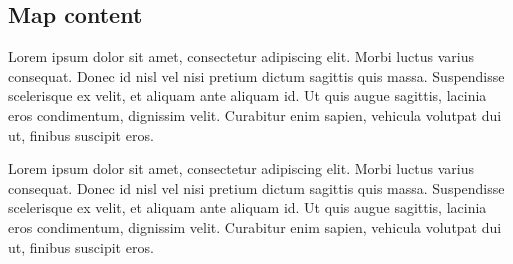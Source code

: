 
\subsection{Map content}

Lorem ipsum dolor sit amet, consectetur adipiscing elit. Morbi luctus varius consequat. Donec id nisl vel nisi pretium dictum sagittis quis massa. Suspendisse scelerisque ex velit, et aliquam ante aliquam id. Ut quis augue sagittis, lacinia eros condimentum, dignissim velit. Curabitur enim sapien, vehicula volutpat dui ut, finibus suscipit eros. 

Lorem ipsum dolor sit amet, consectetur adipiscing elit. Morbi luctus varius consequat. Donec id nisl vel nisi pretium dictum sagittis quis massa. Suspendisse scelerisque ex velit, et aliquam ante aliquam id. Ut quis augue sagittis, lacinia eros condimentum, dignissim velit. Curabitur enim sapien, vehicula volutpat dui ut, finibus suscipit eros. 

